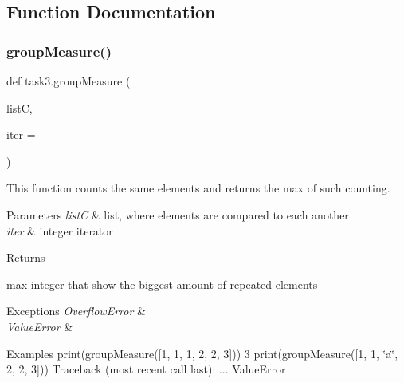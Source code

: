 \subsection{Function Documentation}
\mbox{\label{namespacetask3_a6b40d0f4ac3da0b51afd77ef157756b4}} 
\subsubsection{\texorpdfstring{group\+Measure()}{groupMeasure()}}
{\footnotesize\ttfamily def task3.\+group\+Measure (\begin{DoxyParamCaption}\item[{}]{listC,  }\item[{}]{iter = {} }\end{DoxyParamCaption})}



This function counts the same elements and returns the max of such counting. 


\begin{DoxyParams}{Parameters}
{\em listC} & list, where elements are compared to each another \\
\hline
{\em iter} & integer iterator \\
\hline
\end{DoxyParams}
\begin{DoxyReturn}{Returns}


max integer that show the biggest amount of repeated elements
\end{DoxyReturn}

\begin{DoxyExceptions}{Exceptions}
{\em Overflow\+Error} & \\
\hline
{\em Value\+Error} & \\
\hline
\end{DoxyExceptions}
\begin{DoxyParagraph}{Examples}
print(group\+Measure(\mbox{[}1, 1, 1, 2, 2, 3\mbox{]})) 3 print(group\+Measure(\mbox{[}1, 1, \char`\"{}a\char`\"{}, 2, 2, 3\mbox{]})) Traceback (most recent call last)\+: ... Value\+Error 
\end{DoxyParagraph}
\mbox{\label{namespacetask3_abba7e8af5c5248ae896e372877accedc}} 
